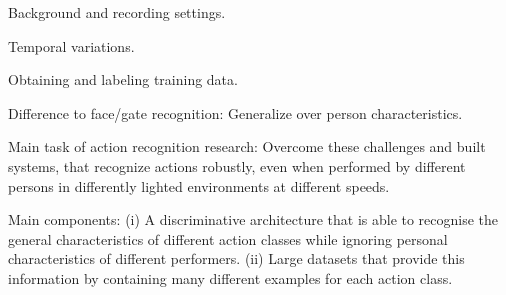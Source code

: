 Background and recording settings.

Temporal variations.

Obtaining and labeling training data.

Difference to face/gate recognition: Generalize over person characteristics.

Main task of action recognition research: Overcome these challenges and built systems, that recognize actions robustly, even when performed by different persons in differently lighted environments at different speeds.

Main components: (i) A discriminative architecture that is able to recognise the general characteristics of different action classes while ignoring personal characteristics of different performers. (ii) Large datasets that provide this information by containing many different examples for each action class.
